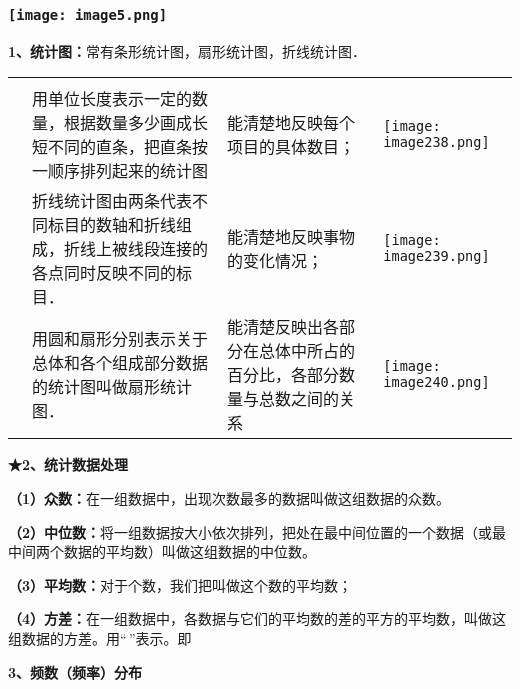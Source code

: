 \hypertarget{ux5b66ux79d1ux7f51www.zxxk.com--ux6559ux80b2ux8d44ux6e90ux95e8ux6237ux63d0ux4f9bux8bd5ux9898ux8bd5ux5377ux6559ux6848ux8bfeux4ef6ux6559ux5b66ux8bbaux6587ux7d20ux6750ux7b49ux5404ux7c7bux6559ux5b66ux8d44ux6e90ux5e93ux4e0bux8f7dux8fd8ux6709ux5927ux91cfux4e30ux5bccux7684ux6559ux5b66ux8d44ux8baf-43}{%
\subsubsection{\texorpdfstring{\protect\texttt{[image: image5.png]}}{学科网(www.zxxk.com)-\/-教育资源门户，提供试题试卷、教案、课件、教学论文、素材等各类教学资源库下载，还有大量丰富的教学资讯！}}\label{ux5b66ux79d1ux7f51www.zxxk.com--ux6559ux80b2ux8d44ux6e90ux95e8ux6237ux63d0ux4f9bux8bd5ux9898ux8bd5ux5377ux6559ux6848ux8bfeux4ef6ux6559ux5b66ux8bbaux6587ux7d20ux6750ux7b49ux5404ux7c7bux6559ux5b66ux8d44ux6e90ux5e93ux4e0bux8f7dux8fd8ux6709ux5927ux91cfux4e30ux5bccux7684ux6559ux5b66ux8d44ux8baf-43}}

\textbf{1、统计图：}常有条形统计图，扇形统计图，折线统计图．

\begin{longtable}[]{@{}llll@{}}
\toprule
\endhead
& & &\tabularnewline
&
用单位长度表示一定的数量，根据数量多少画成长短不同的直条，把直条按一顺序排列起来的统计图
& 能清楚地反映每个项目的具体数目； &
\texttt{[image: image238.png]}\tabularnewline
&
折线统计图由两条代表不同标目的数轴和折线组成，折线上被线段连接的各点同时反映不同的标目．
& 能清楚地反映事物的变化情况； &
\texttt{[image: image239.png]}\tabularnewline
& 用圆和扇形分别表示关于总体和各个组成部分数据的统计图叫做扇形统计图． &
能清楚反映出各部分在总体中所占的百分比，各部分数量与总数之间的关系 &
\texttt{[image: image240.png]}\tabularnewline
\bottomrule
\end{longtable}

\textbf{★2、统计数据处理}

\textbf{（1）众数：}在一组数据中，出现次数最多的数据叫做这组数据的众数。

\textbf{（2）中位数：}将一组数据按大小依次排列，把处在最中间位置的一个数据（或最中间两个数据的平均数）叫做这组数据的中位数。

\textbf{（3）平均数：}对于个数，我们把叫做这个数的平均数；

\textbf{（4）方差：}在一组数据中，各数据与它们的平均数的差的平方的平均数，叫做这组数据的方差。用``\,''表示。即

\textbf{3、频数（频率）分布}

